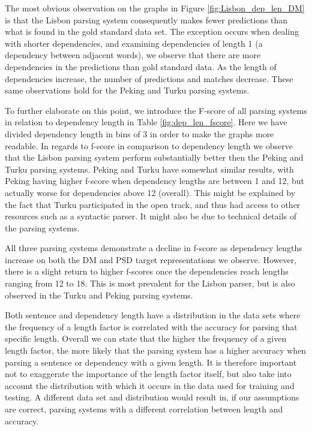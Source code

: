 The most obvious observation on the graphs in Figure \ref{fig:Lisbon_dep_len_DM} is that the Lisbon parsing system consequently makes fewer predictions than what is found in the gold standard data set. The exception occurs when dealing with shorter dependencies, and examining dependencies of length 1 (a dependency between adjacent words), we observe that there are more dependencies in the predictions than gold standard data. As the length of dependencies increase, the number of predictions and matches decrease. These same observations hold for the Peking and Turku parsing systems.

To further elaborate on this point, we introduce the F-score of all parsing systems in relation to dependency length in Table \ref{fig:dep_len_fscore}. Here we have divided dependency length in bins of 3 in order to make the graphs more readable. In regards to f-score in comparison to dependency length we observe that the Lisbon parsing system perform substantially better then the Peking and Turku parsing systems. Peking and Turku have somewhat similar results, with Peking having higher f-score when dependency lengths are between 1 and 12, but actually worse for dependencies above 12 (overall). This might be explained by the fact that Turku participated in the open track, and thus had access to other resources such as a syntactic parser. It might also be due to technical details of the parsing systems.

All three parsing systems demonstrate a decline in f-score as dependency lengths increase on both the DM and PSD target representations we observe. However, there is a slight return to higher f-scores once the dependencies reach lengths ranging from 12 to 18. This is most prevalent for the Lisbon parser, but is also observed in the Turku and Peking parsing systems.

Both sentence and dependency length have a distribution in the data sets where the frequency of a length factor is correlated with the accuracy for parsing that specific length. Overall we can state that the higher the frequency of a given length factor, the more likely that the parsing system has a higher accuracy when parsing a sentence or dependency with a given length. It is therefore important not to exaggerate the importance of the length factor itself, but also take into account the distribution with which it occurs in the data used for training and testing. A different data set and distribution would result in, if our assumptions are correct, parsing systems with a different correlation between length and accuracy.

